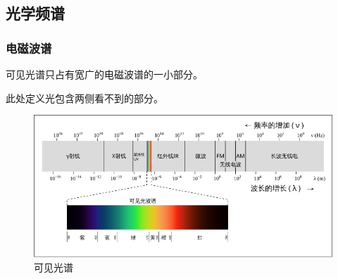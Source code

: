 \documentclass[8pt, aspectratio=169]{ctexbeamer}
\begin{document}

\subsection{光学频谱}

\begin{frame}[allowframebreaks]
	\frametitle{电磁波谱}
	可见光谱只占有宽广的电磁波谱的一小部分。

	此处定义光包含两侧看不到的部分。
	\begin{figure}
		\includegraphics[width=0.7\linewidth]{EM_spectrum_zh-hans.svg.png}
		\caption{可见光谱}
	\end{figure}
\end{frame}

\end{document}
